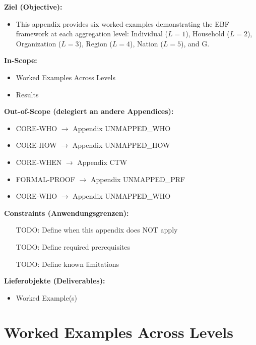 \begin{tcolorbox}[
    colback=orange!5!white,
    colframe=orange!75!black,
    title={\textbf{Appendix Scope: Ziel / In-Scope / Out-of-Scope / Constraints}},
    fonttitle=\bfseries
]

\textbf{Ziel (Objective):}
\begin{itemize}[nosep]
    \item This appendix provides six worked examples demonstrating the EBF framework
at each aggregation level: Individual ($L=1$), Household ($L=2$),
Organization ($L=3$), Region ($L=4$), Nation ($L=5$), and G.
\end{itemize}

\textbf{In-Scope:}
\begin{itemize}[nosep]
    \item Worked Examples Across Levels
    \item Results
\end{itemize}

\textbf{Out-of-Scope (delegiert an andere Appendices):}
\begin{itemize}[nosep]
    \item CORE-WHO $\rightarrow$ Appendix UNMAPPED_WHO
    \item CORE-HOW $\rightarrow$ Appendix UNMAPPED_HOW
    \item CORE-WHEN $\rightarrow$ Appendix CTW
    \item FORMAL-PROOF $\rightarrow$ Appendix UNMAPPED_PRF
    \item CORE-WHO $\rightarrow$ Appendix UNMAPPED_WHO
\end{itemize}

\textbf{Constraints (Anwendungsgrenzen):}
\begin{itemize}[nosep]
    \item [TODO: Define when this appendix does NOT apply]
    \item [TODO: Define required prerequisites]
    \item [TODO: Define known limitations]
\end{itemize}

\textbf{Lieferobjekte (Deliverables):}
\begin{itemize}[nosep]
    \item Worked Example(s)
\end{itemize}

\end{tcolorbox}


\section{Worked Examples Across Levels}
\label{app:examples}

